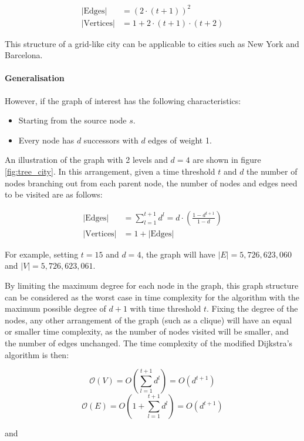 $$
\begin{aligned}
    |\text{Edges}|&=(2\cdot(t+1))^2\\
    |\text{Vertices}|&=1+2\cdot(t+1)\cdot(t+2)
\end{aligned}
$$

This structure of a grid-like city can be applicable to cities such as New York and Barcelona.

\paragraph{Generalisation}

However, if the graph of interest has the following characteristics:

\begin{itemize}
    \item Starting from the source node $s$.
    \item Every node has $d$ successors with $d$ edges of weight 1.
\end{itemize}

An illustration of the graph with 2 levels and $d = 4$ are shown in figure \ref{fig:tree_city}. In this arrangement, given a time threshold $t$ and $d$ the number of nodes branching out from each parent node, the number of nodes and edges need to be visited are as follows:

$$
\begin{aligned}
    |\text{Edges}|&=\sum_{l=1}^{t+1} d^l=d\cdot\left(\frac{1-d^{t+1}}{1-d}\right)\\
    |\text{Vertices}|&=1+|\text{Edges}|
\end{aligned}
$$

For example, setting $t=15$ and $d=4$, the graph will have $|E|=5,726,623,060$ and $|V|=5,726,623,061$.

By limiting the maximum degree for each node in the graph, this graph structure can be considered as the worst case in time complexity for the algorithm with the maximum possible degree of $d+1$ with time threshold $t$. Fixing the degree of the nodes, any other arrangement of the graph (such as a clique) will have an equal or smaller time complexity, as the number of nodes visited will be smaller, and the number of edges unchanged. The time complexity of the modified Dijkstra's algorithm is then:

$$\mathcal{O}(V)=O(\sum_{l=1}^{t+1} d^l)=O(d^{t+1})$$
$$\mathcal{O}(E)=O(1+\sum_{l=1}^{t+1} d^l)=O(d^{t+1})$$

and

